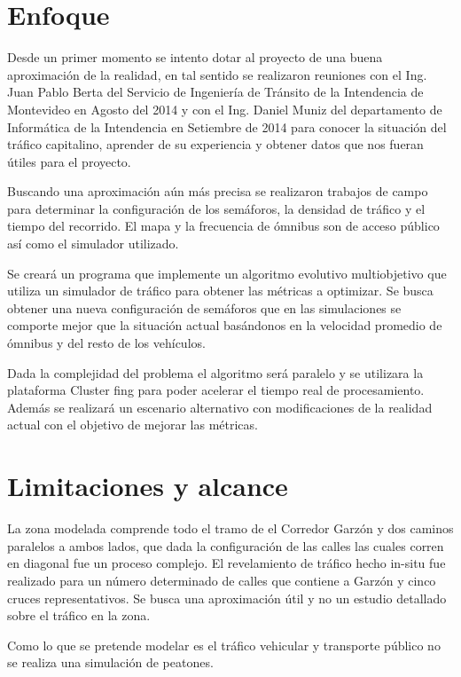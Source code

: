  
\section{Enfoque}

Desde un primer momento se intento dotar al proyecto de una buena aproximación de la realidad, en tal sentido se realizaron reuniones con el Ing. Juan Pablo Berta del Servicio de Ingeniería de Tránsito de la Intendencia de Montevideo en Agosto del  2014 y con el Ing. Daniel Muniz del departamento de Informática de la Intendencia en Setiembre de 2014 para conocer la situación del tráfico capitalino, aprender de su experiencia y obtener datos que nos fueran útiles para el proyecto.


Buscando una aproximación aún más precisa se realizaron trabajos de campo para determinar la configuración de los semáforos, la densidad de tráfico y el tiempo del recorrido. El mapa y la frecuencia de ómnibus son de acceso público así como el simulador utilizado.

Se creará un programa que implemente un algoritmo evolutivo multiobjetivo que utiliza un simulador de tráfico para obtener las métricas a optimizar. Se busca obtener una nueva configuración de semáforos que en las simulaciones se comporte mejor que la situación actual basándonos en la velocidad promedio de ómnibus y del resto de los vehículos.

Dada la complejidad del problema el algoritmo será paralelo y se utilizara la plataforma Cluster fing para poder acelerar el tiempo real de procesamiento. Además se realizará un escenario alternativo con modificaciones de la realidad actual con el objetivo de mejorar las métricas.

\section{Limitaciones y alcance}

La zona modelada comprende todo el tramo de el Corredor Garzón y dos caminos paralelos a ambos lados, que dada la configuración de las calles las cuales corren en diagonal fue un proceso complejo.
El revelamiento de tráfico hecho in-situ fue realizado para un número determinado de calles que contiene a Garzón y cinco cruces representativos. Se busca una aproximación útil y no un estudio detallado sobre el tráfico en la zona.

Como lo que se pretende modelar es el tráfico vehicular y transporte público no se realiza una simulación de peatones.


